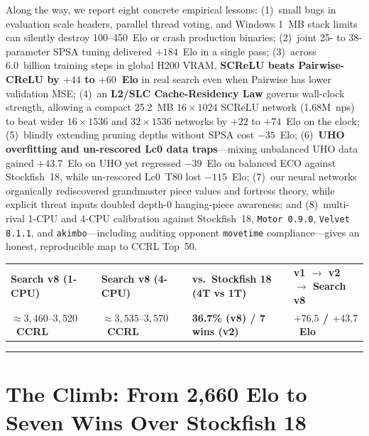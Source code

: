 \documentclass[10.5pt,letterpaper]{article}
\begin{document}
\begin{abstractbox}
Along the way, we report eight concrete empirical lessons: (1)~small bugs in evaluation scale headers, parallel thread voting, and Windows 1~MB stack limits can silently destroy 100--450~Elo or crash production binaries; (2)~joint 25- to 38-parameter SPSA tuning delivered $+184$~Elo in a single pass; (3)~across 6.0~billion training steps in global H200 VRAM, \textbf{SCReLU beats Pairwise-CReLU by $+44$ to $+60$~Elo} in real search even when Pairwise has lower validation MSE; (4)~an \textbf{L2/SLC Cache-Residency Law} governs wall-clock strength, allowing a compact 25.2~MB $16\times 1024$ SCReLU network (1.68M~nps) to beat wider $16\times 1536$ and $32\times 1536$ networks by $+22$ to $+74$~Elo on the clock; (5)~blindly extending pruning depths without SPSA cost $-35$~Elo; (6)~\textbf{UHO overfitting and un-rescored Lc0 data traps}---mixing unbalanced UHO data gained $+43.7$~Elo on UHO yet regressed $-39$~Elo on balanced ECO against Stockfish~18, while un-rescored Lc0~T80 lost $-115$~Elo; (7)~our neural networks organically rediscovered grandmaster piece values and fortress theory, while explicit threat inputs doubled depth-0 hanging-piece awareness; and (8)~multi-rival 1-CPU and 4-CPU calibration against Stockfish~18, \texttt{Motor 0.9.0}, \texttt{Velvet 8.1.1}, and \texttt{akimbo}---including auditing opponent \texttt{movetime} compliance---gives an honest, reproducible map to CCRL Top~50.
\end{abstractbox}

\vspace{6pt}
\begin{center}
\small
\begin{tabular}{@{}l@{\quad\;\;}l@{\quad\;\;}l@{\quad\;\;}l@{}}
\textbf{\color{dmnavy}Search v8 (1-CPU)} & \textbf{\color{dmnavy}Search v8 (4-CPU)} & \textbf{\color{dmnavy}vs.\ Stockfish 18 (4T vs 1T)} & \textbf{\color{dmnavy}v1 $\to$ v2 $\to$ Search v8} \\
\color{dmblue}\textbf{$\approx 3{,}460\text{--}3{,}520$~CCRL} & \color{dmblue}\textbf{$\approx 3{,}535\text{--}3{,}570$~CCRL} & \color{dmteal}\textbf{36.7\% (v8) / 7 wins (v2)} & \color{dmteal}\textbf{$+76.5$ / $+43.7$~Elo} \\
\end{tabular}
\end{center}
\vspace{2pt}
{\color{dmborder}\rule{\textwidth}{0.6pt}}

\section{The Climb: From 2,660 Elo to Seven Wins Over Stockfish 18}
\end{document}
